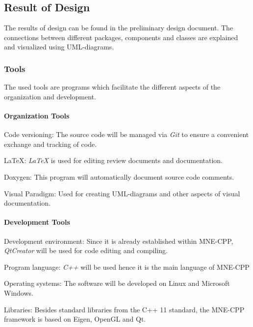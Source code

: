 \subsection{Result of Design}

The results of design can be found in the preliminary design document.
The connections between different packages, components and classes are explained and visualized using UML-diagrams. 

\subsubsection{Tools} 

The used tools are programs which facilitate the different aspects of the organization and development.

\paragraph{Organization Tools}
	\begin{aims}
		
		\item[Code versioning:] The source code will be managed via \textit{Git} to ensure a convenient exchange and tracking of code.
		
		\item[LaTeX:] \textit{LaTeX} is used for editing review documents and documentation.
		
		\item[Doxygen:] This program will automatically document source code comments.
		
		\item[Visual Paradigm:] Used for creating UML-diagrams and other aspects of visual documentation. 
	\end{aims}

\paragraph{Development Tools}
	\begin{aims}
		
		\item[Development environment:] Since it is already established within MNE-CPP, \textit{QtCreator} will be used for code editing and compiling.
		
		\item[Program language:] \textit{C++} will be used hence it is the main language of MNE-CPP 
		\item[Operating systems:] The software will be developed on Linux and Microsoft Windows.
		
		\item[Libraries:] Besides standard libraries from the C++ 11 standard, the MNE-CPP framework is based on Eigen, OpenGL and Qt.
		
	\end{aims}

